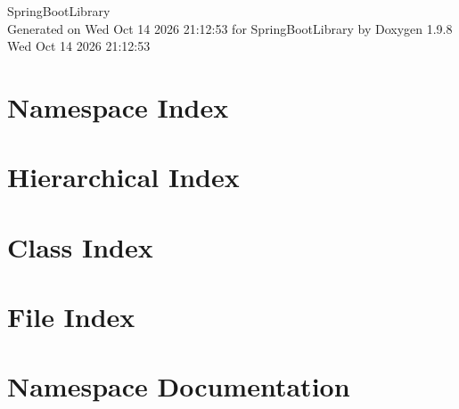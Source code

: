 \documentclass[twoside]{book}
\newcommand{\+}{\discretionary{\mbox{\scriptsize$\hookleftarrow$}}{}{}}
\newcommand{\clearemptydoublepage}{%
    \newpage{\pagestyle{empty}\cleardoublepage}%
  }
\begin{document}
  \raggedbottom
    \hypersetup{pageanchor=false,
                bookmarksnumbered=true,
                pdfencoding=unicode
               }
  \begin{titlepage}
  \vspace*{7cm}
  \begin{center}%
  {\Large Spring\+Boot\+Library}\\
  \vspace*{1cm}
  {\large Generated on Wed Oct 14 2026 21\+:12\+:53 for Spring\+Boot\+Library by Doxygen 1.9.8}\\
    \vspace*{0.5cm}
    {\small Wed Oct 14 2026 21:12:53}
  \end{center}
  \end{titlepage}
  \clearemptydoublepage
  \tableofcontents
  \clearemptydoublepage
  \hypersetup{pageanchor=true}
\chapter{Namespace Index}

\chapter{Hierarchical Index}

\chapter{Class Index}

\chapter{File Index}

\chapter{Namespace Documentation}








\end{document}
